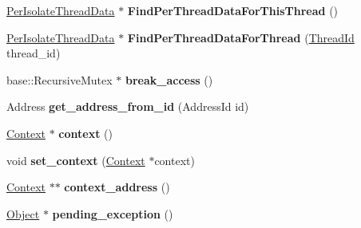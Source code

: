 \begin{DoxyCompactItemize}
\item 
\hypertarget{classv8_1_1internal_1_1_isolate_a67b9b549f88af4e2e59ccd65694a9c3b}{}\hyperlink{classv8_1_1internal_1_1_isolate_1_1_per_isolate_thread_data}{Per\+Isolate\+Thread\+Data} $\ast$ {\bfseries Find\+Per\+Thread\+Data\+For\+This\+Thread} ()\label{classv8_1_1internal_1_1_isolate_a67b9b549f88af4e2e59ccd65694a9c3b}

\item 
\hypertarget{classv8_1_1internal_1_1_isolate_a0038635b49c04ad3f746c0d6d149da4a}{}\hyperlink{classv8_1_1internal_1_1_isolate_1_1_per_isolate_thread_data}{Per\+Isolate\+Thread\+Data} $\ast$ {\bfseries Find\+Per\+Thread\+Data\+For\+Thread} (\hyperlink{classv8_1_1internal_1_1_thread_id}{Thread\+Id} thread\+\_\+id)\label{classv8_1_1internal_1_1_isolate_a0038635b49c04ad3f746c0d6d149da4a}

\item 
\hypertarget{classv8_1_1internal_1_1_isolate_aee63083185199159f3950d326c6ddffe}{}base\+::\+Recursive\+Mutex $\ast$ {\bfseries break\+\_\+access} ()\label{classv8_1_1internal_1_1_isolate_aee63083185199159f3950d326c6ddffe}

\item 
\hypertarget{classv8_1_1internal_1_1_isolate_aa007e047fe4ff7fa6f2e59c24cb8a47b}{}Address {\bfseries get\+\_\+address\+\_\+from\+\_\+id} (Address\+Id id)\label{classv8_1_1internal_1_1_isolate_aa007e047fe4ff7fa6f2e59c24cb8a47b}

\item 
\hypertarget{classv8_1_1internal_1_1_isolate_a8b9683af6d7e7565f2061120ad556bfb}{}\hyperlink{classv8_1_1internal_1_1_context}{Context} $\ast$ {\bfseries context} ()\label{classv8_1_1internal_1_1_isolate_a8b9683af6d7e7565f2061120ad556bfb}

\item 
\hypertarget{classv8_1_1internal_1_1_isolate_a7d8f52ec73bf79912973575e19ef1b54}{}void {\bfseries set\+\_\+context} (\hyperlink{classv8_1_1internal_1_1_context}{Context} $\ast$context)\label{classv8_1_1internal_1_1_isolate_a7d8f52ec73bf79912973575e19ef1b54}

\item 
\hypertarget{classv8_1_1internal_1_1_isolate_acfd88f787ab0d3cdac820d09fb83c802}{}\hyperlink{classv8_1_1internal_1_1_context}{Context} $\ast$$\ast$ {\bfseries context\+\_\+address} ()\label{classv8_1_1internal_1_1_isolate_acfd88f787ab0d3cdac820d09fb83c802}

\item 
\hypertarget{classv8_1_1internal_1_1_isolate_a54dbed52bdf4103d3d4265b380dee47a}{}\hyperlink{classv8_1_1internal_1_1_object}{Object} $\ast$ {\bfseries pending\+\_\+exception} ()\label{classv8_1_1internal_1_1_isolate_a54dbed52bdf4103d3d4265b380dee47a}


\end{DoxyCompactItemize}
